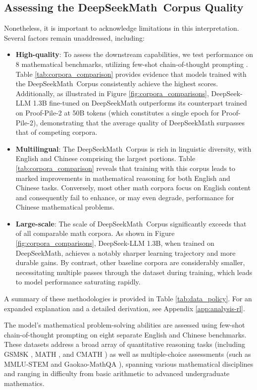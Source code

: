 {\subsection{Assessing the DeepSeekMath~Corpus Quality}

Nonetheless, it is important to acknowledge limitations in this interpretation. Several factors remain unaddressed, including:

\begin{itemize}[topsep=0pt]
    \item \textbf{High-quality}:
    To assess the downstream capabilities, we test performance on 8 mathematical benchmarks, utilizing few-shot chain-of-thought prompting \cite{cot}. Table \ref{tab:corpora_comparison} provides evidence that models trained with the DeepSeekMath~Corpus consistently achieve the highest scores. Additionally, as illustrated in Figure \ref{fig:corpora_comparisons}, DeepSeek-LLM 1.3B fine-tuned on DeepSeekMath outperforms its counterpart trained on Proof-Pile-2 at 50B tokens (which constitutes a single epoch for Proof-Pile-2), demonstrating that the average quality of DeepSeekMath surpasses that of competing corpora.
    \item \textbf{Multilingual}:
    The DeepSeekMath~Corpus is rich in linguistic diversity, with English and Chinese comprising the largest portions. Table \ref{tab:corpora_comparison} reveals that training with this corpus leads to marked improvements in mathematical reasoning for both English and Chinese tasks. Conversely, most other math corpora focus on English content and consequently fail to enhance, or may even degrade, performance for Chinese mathematical problems.
    \item \textbf{Large-scale}:
    The scale of DeepSeekMath~Corpus significantly exceeds that of all comparable math corpora. As shown in Figure \ref{fig:corpora_comparisons}, DeepSeek-LLM 1.3B, when trained on DeepSeekMath, achieves a notably sharper learning trajectory and more durable gains. By contrast, other baseline corpora are considerably smaller, necessitating multiple passes through the dataset during training, which leads to model performance saturating rapidly.
\end{itemize}

A summary of these methodologies is provided in Table \ref{tab:data_policy}. For an expanded explanation and a detailed derivation, see Appendix \ref{app:analysis-rl}.

The model’s mathematical problem-solving abilities are assessed using few-shot chain-of-thought prompting \citep{cot} on eight separate English and Chinese benchmarks. These datasets address a broad array of quantitative reasoning tasks (including GSM8K \citep{gsm8k}, MATH \citep{MATH}, and CMATH \citep{wei2023cmath}) as well as multiple-choice assessments (such as MMLU-STEM \citep{mmlu} and Gaokao-MathQA \citep{agieval}), spanning various mathematical disciplines and ranging in difficulty from basic arithmetic to advanced undergraduate mathematics.

}
